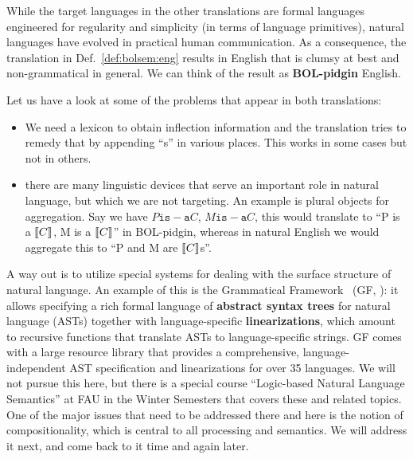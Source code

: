 \begin{remark}
While the target languages in the other translations are formal languages engineered for regularity and simplicity (in terms of language primitives), natural languages have evolved in practical human communication.
As a consequence, the translation in Def.~\ref{def:bolsem:eng} results in English that is clumsy at best and non-grammatical in general.
We can think of the result as \textbf{BOL-pidgin} English.

Let us have a look at some of the problems that appear in both translations:
\begin{itemize}
\item We need a lexicon to obtain inflection information and the translation tries to remedy that by appending ``s'' in various places.
This works in some cases but not in others.
\item there are many linguistic devices that serve an important role in natural language, but which we are not targeting.
An example is plural objects for aggregation.
Say we have $P \mathtt{is-a} C$, $M \mathtt{is-a} C$, this would translate to ``P is a $\llbracket C\rrbracket$, M is a $\llbracket C\rrbracket$'' in BOL-pidgin, whereas in natural English we would aggregate this to ``P and M are $\llbracket C\rrbracket$s''.
\end{itemize}

A way out is to utilize special systems for dealing with the surface structure of natural language.
An example of this is the Grammatical Framework~ (GF, \cite{gf}): it allows specifying a rich formal language of \textbf{abstract syntax trees} for natural language (ASTs) together with language-specific \textbf{linearizations}, which amount to recursive functions that translate ASTs to language-specific strings.
GF comes with  a large resource library that provides a comprehensive, language-independent AST specification and linearizations for over 35 languages.
We will not pursue this here, but there is a special course ``Logic-based Natural Language Semantics'' at FAU in the Winter Semesters that covers these and related topics.
One of the major issues that need to be addressed there and here is the notion of compositionality, which is central to all processing and semantics. We will address it next, and come back to it time and again later. 
\end{remark}

